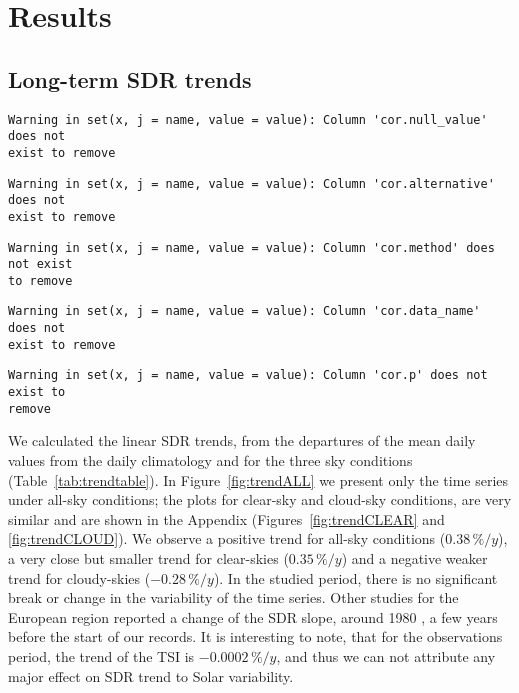\documentclass[applsci,article,submit,moreauthors,pdftex]{Definitions/mdpi}
\begin{document}
\hypertarget{results}{%
\section{Results}\label{results}}

\hypertarget{long-term-sdr-trends}{%
\subsection{Long-term SDR trends}\label{long-term-sdr-trends}}

\begin{verbatim}
Warning in set(x, j = name, value = value): Column 'cor.null_value' does not
exist to remove
\end{verbatim}

\begin{verbatim}
Warning in set(x, j = name, value = value): Column 'cor.alternative' does not
exist to remove
\end{verbatim}

\begin{verbatim}
Warning in set(x, j = name, value = value): Column 'cor.method' does not exist
to remove
\end{verbatim}

\begin{verbatim}
Warning in set(x, j = name, value = value): Column 'cor.data_name' does not
exist to remove
\end{verbatim}

\begin{verbatim}
Warning in set(x, j = name, value = value): Column 'cor.p' does not exist to
remove
\end{verbatim}

We calculated the linear SDR trends, from the departures of the mean
daily values from the daily climatology and for the three sky conditions
(Table~\ref{tab:trendtable}). In Figure~\ref{fig:trendALL} we present
only the time series under all-sky conditions; the plots for clear-sky
and cloud-sky conditions, are very similar and are shown in the Appendix
(Figures~\ref{fig:trendCLEAR} and~ \ref{fig:trendCLOUD}). We observe a
positive trend for all-sky conditions (\(0.38\,\%/y\)), a very close but
smaller trend for clear-skies (\(0.35\,\%/y\)) and a negative weaker
trend for cloudy-skies (\(-0.28\,\%/y\)). In the studied period, there
is no significant break or change in the variability of the time series.
Other studies for the European region reported a change of the SDR
slope, around 1980 \citep{Wild2021, Yuan2021, Ohmura2009}, a few years
before the start of our records. It is interesting to note, that for the
observations period, the trend of the TSI is \(-0.0002\,\%/y\), and thus
we can not attribute any major effect on SDR trend to Solar variability.
\end{document}
